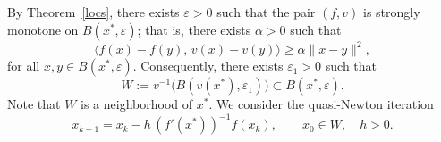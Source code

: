 \documentclass[11pt]{article}
\makeatletter
\renewenvironment{proof}[1][\proofname]{\par
	\normalfont
	\topsep0\p@\@plus3\p@ \trivlist
	\item[\hskip\labelsep\itshape
	#1\@addpunct{.}]\ignorespaces
}{%
	\qed\endtrivlist
}
\newtheorem{theorem}{Theorem}[section]
\theoremstyle{definition}
\theoremstyle{definition}
\theoremstyle{definition}
\newcommand{\tcr}{\textcolor{red}}
\def\beq{\begin{equation}}
\def\eeq{\end{equation}}
\def\tcr{ \textcolor{red}}
\makeatother
\begin{document}
%


By Theorem~\ref{locs}, there exists \(\varepsilon>0\) such that the pair \((f,v)\) is strongly monotone on \(B(x^*,\varepsilon)\); that is, there exists \(\alpha>0\) such that
\begin{equation}\label{stm}
\langle f(x)-f(y),\, v(x)-v(y) \rangle
\ge \alpha\|x-y\|^2,
\end{equation}
for all \(x,y\in B(x^*,\varepsilon)\).
Consequently, there exists \(\varepsilon_1>0\) such that
\[
W:=v^{-1}\bigl(B(v(x^*),\varepsilon_1)\bigr)\subset B(x^*,\varepsilon).
\]
Note that \(W\) is a neighborhood of \(x^*\).
We consider the quasi-Newton iteration
\begin{equation}\label{quan}
x_{k+1}
= x_k - h\,(f'(x^*))^{-1}f(x_k),
\qquad x_0\in W,\quad h>0.
\end{equation}
\end{document}
